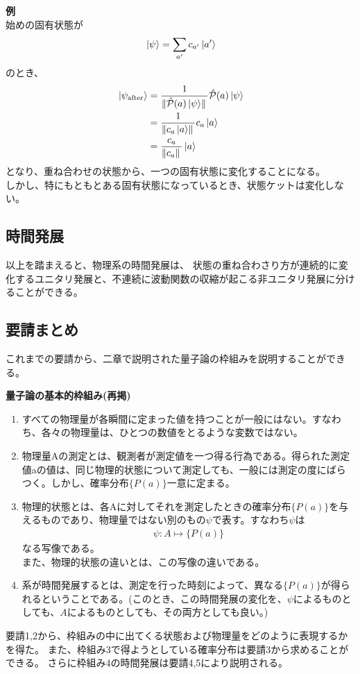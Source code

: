 \documentclass[a4paper,11pt]{jsarticle}
\begin{document}
\textbf{例}\\
始めの固有状態が
\begin{align}
    \ket*{\psi} = \sum_{a'} c_{a'}\ket*{a'}
\end{align}
のとき、
\begin{align}
    \ket*{\psi_{\mathrm{after}}}
    &=\frac{1}{\norm*{\hat{\mathcal{P}}(a)\ket*{\psi}}}\hat{\mathcal{P}}(a)\ket*{\psi}\\
    &=\frac{1}{\norm*{{c_a \ket*{a}}}}c_a \ket*{a}\\
    &=\frac{c_a}{\norm*{c_a}}\ket*{a}
\end{align}
となり、重ね合わせの状態から、一つの固有状態に変化することになる。\\
しかし、特にもともとある固有状態になっているとき、状態ケットは変化しない。\\

\subsection{時間発展}
以上を踏まえると、物理系の時間発展は、
状態の重ね合わさり方が連続的に変化するユニタリ発展と、不連続に波動関数の収縮が起こる非ユニタリ発展に分けることができる。

\subsection{要請まとめ}
これまでの要請から、二章で説明された量子論の枠組みを説明することができる。
\begin{itembox}[l]{\textbf{量子論の基本的枠組み(再掲)}}
    \begin{enumerate}
      \item すべての物理量が各瞬間に定まった値を持つことが一般にはない。すなわち、各々の物理量は、ひとつの数値をとるような変数ではない。
      \item 物理量Aの測定とは、観測者が測定値を一つ得る行為である。得られた測定値aの値は、同じ物理的状態について測定しても、一般には測定の度にばらつく。しかし、確率分布$\{P(a)\}$一意に定まる。
       \item 物理的状態とは、各Aに対してそれを測定したときの確率分布$\{P(a)\}$を与えるものであり、物理量ではない別のもの$\psi$で表す。すなわち$\psi$は
  \begin{align}
  \psi : A \mapsto \{P(a)\}
  \end{align}
  なる写像である。\\
  また、物理的状態の違いとは、この写像の違いである。
  \item 系が時間発展するとは、測定を行った時刻によって、異なる$\{P(a)\}$が得られるということである。(このとき、この時間発展の変化を、$\psi$によるものとしても、$A$によるものとしても、その両方としても良い。)
    \end{enumerate}  
\end{itembox}
要請1,2から、枠組みの中に出てくる状態および物理量をどのように表現するかを得た。
また、枠組み3で得ようとしている確率分布は要請3から求めることができる。
さらに枠組み4の時間発展は要請4,5により説明される。
\end{document}
